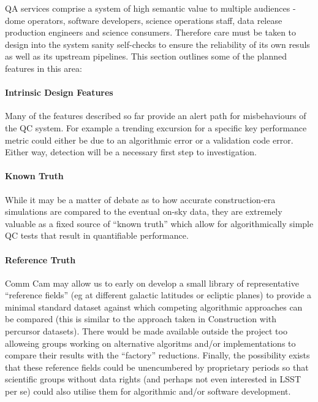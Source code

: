 QA services comprise a system of high semantic value to multiple audiences - dome operators, software developers, science operations staff, data release production engineers and science consumers. Therefore care must be taken to design into the system sanity self-checks to ensure the reliability of its own resuls as well as its upstream pipelines. This section outlines some of the planned features in this area:

\paragraph{Intrinsic Design Features}

Many of the features described so far provide an alert path for misbehaviours of the QC system. For example a trending excursion for a specific key performance metric could either be due to an algorithmic error or a validation code error. Either way, detection will be a necessary first step to investigation.

\paragraph{Known Truth}

While it may be a matter of debate as to how accurate construction-era simulations are compared to the eventual on-sky data, they are extremely valuable as a fixed source of ``known truth'' which allow for algorithmically simple QC tests that result in quantifiable performance.

\paragraph{Reference Truth}

Comm Cam may allow us to early on develop a small library of representative ``reference fields'' (eg at different galactic latitudes or ecliptic planes) to provide a minimal standard dataset against which competing algorithmic approaches can be compared (this is similar to the approach taken in Construction with percursor datasets). There would be made available outside the project too alloweing groups working on alternative algoritms and/or implementations to compare their results with the ``factory'' reductions. Finally, the possibility exists that these reference fields could be unencumbered by proprietary periods so that scientific groups without data rights (and perhaps not even interested in LSST per se) could also utilise them for algorithmic and/or software development.
